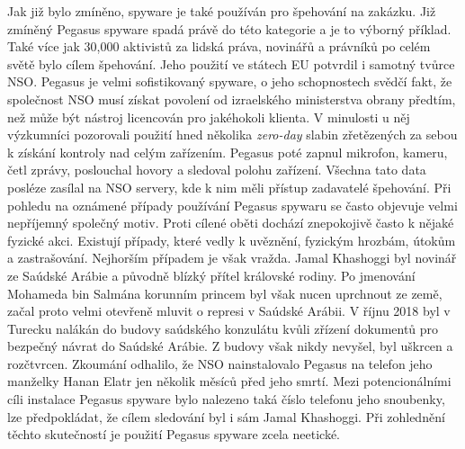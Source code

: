 Jak již bylo zmíněno, spyware je také používán pro špehování na zakázku.
Již zmíněný Pegasus spyware spadá právě do této kategorie a je to výborný příklad.
Také více jak 30,000 aktivistů za lidská práva, novinářů a právníků po celém světě bylo cílem špehování.
Jeho použití ve státech \ac{EU} potvrdil i samotný tvůrce NSO\@.
Pegasus je velmi sofistikovaný spyware, o jeho schopnostech svědčí fakt, že společnost NSO musí získat povolení od izraelského ministerstva obrany předtím, než může být nástroj licencován pro jakéhokoli klienta.
V minulosti u něj výzkumníci pozorovali použití hned několika \textit{zero-day} slabin zřetězených za sebou k získání kontroly nad celým zařízením.
Pegasus poté zapnul mikrofon, kameru, četl zprávy, poslouchal hovory a sledoval polohu zařízení.
Všechna tato data posléze zasílal na NSO servery, kde k nim měli přístup zadavatelé špehování.
Při pohledu na oznámené případy používání Pegasus spywaru se často objevuje velmi nepříjemný společný motiv.
Proti cílené oběti dochází znepokojivě často k nějaké fyzické akci.
Existují případy, které vedly k uvěznění, fyzickým hrozbám, útokům a zastrašování.
Nejhorším případem je však vražda.
Jamal Khashoggi byl novinář ze Saúdské Arábie a původně blízký přítel královské rodiny.
Po jmenování Mohameda bin Salmána korunním princem byl však nucen uprchnout ze země, začal proto velmi otevřeně mluvit o represi v Saúdské Arábii.
V říjnu 2018 byl v Turecku nalákán do budovy saúdského konzulátu kvůli zřízení dokumentů pro bezpečný návrat do Saúdské Arábie.
Z budovy však nikdy nevyšel, byl uškrcen a rozčtvrcen.
Zkoumání odhalilo, že NSO nainstalovalo Pegasus na telefon jeho manželky Hanan Elatr jen několik měsíců před jeho smrtí\cite{khashoggi_wife_pegasus}.
Mezi potencionálními cíli instalace Pegasus spyware bylo nalezeno taká číslo telefonu jeho snoubenky, lze předpokládat, že cílem sledování byl i sám Jamal Khashoggi.
Při zohlednění těchto skutečností je použití Pegasus spyware zcela neetické.\cite{darknet_100_NSO,Enisa_thread_landscape}

